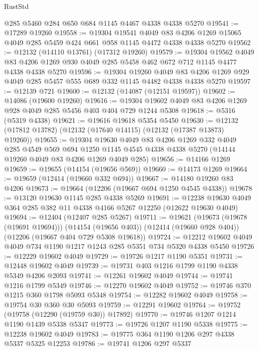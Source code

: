 \begin{lexlean}{RustStd}
\begin{coremodule}
{\begin{coremodule}
{{{{{{{{{{{{{{{{{{{{{{{{{{{{{{{{{{{{{{{{{{{{{{{{{{    @285
    @5460
    @284
    @650
    @684
    @1145
    @4467
    @4338
    @4338
    @5270
@19541 := @17289 @19260
@19558 := @19304
    @19541
    @4049
    @83
    @4206
    @1269
    @15065
    @4049
    @285
    @5459
    @424
    @661
    @958
    @1145
    @4472
    @4338
    @4338
    @5270
@19562 := @12132 (@14110 @13761) (@17312 @19260)
@19579 := @19304
    @19562
    @4049
    @83
    @4206
    @1269
    @930
    @4049
    @285
    @5458
    @462
    @672
    @712
    @1145
    @4477
    @4338
    @4338
    @5270
@19596 := @19304
    @19260
    @4049
    @83
    @4206
    @1269
    @929
    @4049
    @285
    @5457
    @555
    @689
    @332
    @1145
    @4482
    @4338
    @4338
    @5270
@19597 := @12139 @721
@19600 := @12132 (@14087 (@12151 @19597))
@19602 := @14086 (@19600 @19260)
@19616 := @19304 @19602 @4049 @83 @4206 @1269 @928 @4049 @285 @5456 @403 @404 @729 @1244 @5308
@19618 := @5316 (@5319 @4338)
@19621 := @19616 @19618 @5354 @5450
@19630 := @12132 (@17812 @13782) (@12132 (@17640 @14115) (@12132 (@17387 @13873) @19260))
@19655 := @19304
    @19630
    @4049
    @83
    @4206
    @1269
    @332
    @4049
    @285
    @4549
    @569
    @694
    @1250
    @1145
    @4545
    @4338
    @4338
    @5270
    (@14144 @19260 @4049 @83 @4206 @1269 @4049 @285)
@19656 := @14166 @1269
@19659 := @19655 (@14154 (@19656 @569))
@19660 := @14173 @1269
@19664 := @19659 (@12414 (@19660 @332 @694))
@19667 := @14180 @19260 @83 @4206
@19673 := @19664 (@12206 (@19667 @694 @1250 @4545 @4338))
@19678 := @13120 @19630 @1145 @285 @4338 @5269
@19691 := @12238 @19630 @4049 @364 @285 @382 @11 @4338 @4166 @5267 @12250 (@12622 @19630 @4049)
@19694 := @12404 (@12407 @285 @5267)
@19711 := @19621
    (@19673 (@19678 (@19691 @19694)))
    (@14154 (@19656 @403))
    (@12414 (@19660 @928 @404))
    (@12206 (@19667 @404 @729 @5308 @19618))
@19724 := @12212 @19602 @4049 @4049 @734 @1190 @1217 @1243 @285 @5351 @734 @5320 @4338 @5450
@19726 := @12229 @19602 @4049
@19729 := @19726 @1217 @1190 @5351
@19731 := @12448 @19602 @4049
@19739 := @19731 @403 @1216 @1799 @1190 @4338 @5349 @4206 @2093
@19741 := @12261 @19602 @4049
@19744 := @19741 @1216 @1799 @5349
@19746 := @12270 @19602 @4049
@19752 := @19746 @370 @1215 @360 @1798 @5093 @5348
@19754 := @12282 @19602 @4049
@19758 := @19754 @30 @360 @30 @5093
@19759 := @12291 @19602
@19764 := @19752 (@19758 (@12290 (@19759 @30)) @17892)
@19770 := @19746 @1207 @1214 @1190 @1439 @5338 @5347
@19773 := @19726 @1207 @1190 @5338
@19775 := @12238 @19602 @4049
@19783 := @19775 @364 @1190 @1206 @297 @4338 @5337 @5325 @12253
@19786 := @19741 @1206 @297 @5337
}}}}}}}}}}}}}}}}}}}}}}}}}}}}}}}}}}}}}}}}}}}}}}}}}}
\end{coremodule}}
\end{coremodule}
\end{lexlean}
